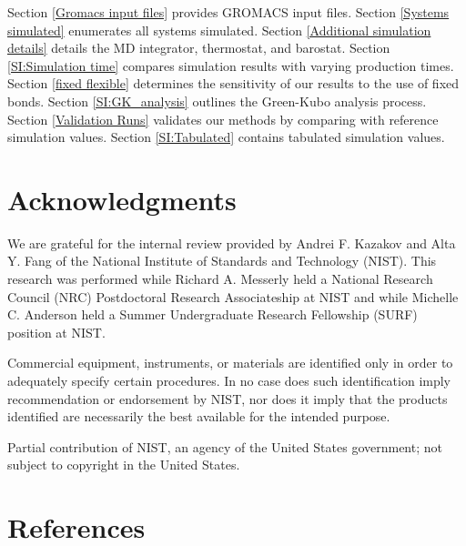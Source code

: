 \documentclass[preprint,review,12pt]{elsarticle}
\begin{document}
    Section \ref{Gromacs input files} provides GROMACS input files.	Section \ref{Systems simulated} enumerates all systems simulated. Section \ref{Additional simulation details} details the MD integrator, thermostat, and barostat. Section \ref{SI:Simulation time} compares simulation results with varying production times. Section \ref{fixed flexible} determines the sensitivity of our results to the use of fixed bonds. Section \ref{SI:GK_analysis} outlines the Green-Kubo analysis process. Section \ref{Validation Runs} validates our methods by comparing with reference simulation values. Section \ref{SI:Tabulated} contains tabulated simulation values.       
	
	\section*{Acknowledgments}
	
	We are grateful for the internal review provided by Andrei F. Kazakov and Alta Y. Fang of the National Institute of Standards and Technology (NIST). This research was performed while Richard A. Messerly held a National Research Council (NRC) Postdoctoral Research Associateship at NIST and while Michelle C. Anderson held a Summer Undergraduate Research Fellowship (SURF) position at NIST. 

	Commercial equipment, instruments, or materials are identified only in order to adequately specify certain procedures. In no case does such identification imply recommendation or endorsement by NIST, nor does it imply that the products identified are necessarily the best available for the intended purpose.
	
	Partial contribution of NIST, an agency of the United States government; not subject to copyright in the United States.
	
	\section*{References}
	
	
	
		
\end{document}
